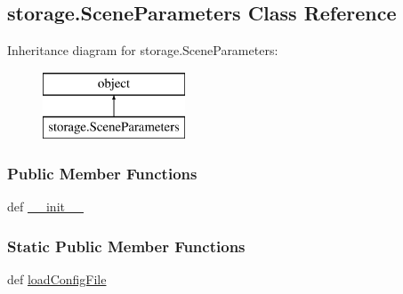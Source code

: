 \hypertarget{classstorage_1_1SceneParameters}{\subsection{storage.\-Scene\-Parameters Class Reference}
\label{classstorage_1_1SceneParameters}
}
Inheritance diagram for storage.\-Scene\-Parameters\-:\begin{figure}[H]
\begin{center}
\leavevmode
\includegraphics[height=2.000000cm]{classstorage_1_1SceneParameters}
\end{center}
\end{figure}
\subsubsection*{Public Member Functions}
\begin{DoxyCompactItemize}
\item 
def \hyperlink{classstorage_1_1SceneParameters_ad255b140a60bb967adb367b4b1207588}{\-\_\-\-\_\-init\-\_\-\-\_\-}
\end{DoxyCompactItemize}
\subsubsection*{Static Public Member Functions}
\begin{DoxyCompactItemize}
\item 
def \hyperlink{classstorage_1_1SceneParameters_a17ff817f2b4ac1d250a283688b72195d}{load\-Config\-File}
\end{DoxyCompactItemize}

